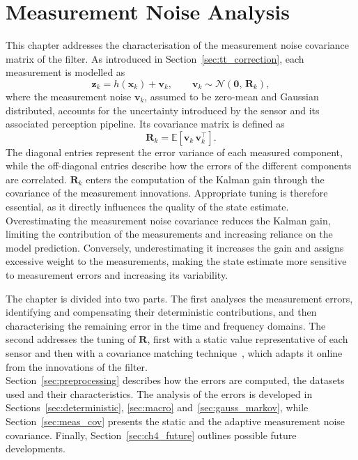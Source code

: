 \chapter{Measurement Noise Analysis}
\label{ch:adaptive_r}

This chapter addresses the characterisation of the measurement noise covariance matrix of
the filter. As introduced in Section~\ref{sec:tt_correction}, each
measurement is modelled as
\begin{equation}
    \mathbf{z}_k = h(\mathbf{x}_k) + \mathbf{v}_k,
    \qquad
    \mathbf{v}_k \sim \mathcal{N}\!\left(\mathbf{0},\, \mathbf{R}_k\right),
    \label{eq:ch4_meas}
\end{equation}
where the measurement noise $\mathbf{v}_k$, assumed to be zero-mean and Gaussian distributed, accounts for the
uncertainty introduced by the sensor and its associated perception pipeline. Its covariance
matrix is defined as
\begin{equation}
    \mathbf{R}_k = \mathbb{E}\left[\mathbf{v}_k\,\mathbf{v}_k^\top\right].
    \label{eq:ch4_Rk}
\end{equation}
The diagonal entries represent the error variance of each measured component, while the
off-diagonal entries describe how the errors of the different components are correlated.
$\mathbf{R}_k$ enters the computation of the Kalman gain through the covariance of the
measurement innovations. Appropriate tuning is therefore essential, as it directly influences
the quality of the state estimate. Overestimating the measurement noise covariance reduces
the Kalman gain, limiting the contribution of the measurements and increasing reliance on
the model prediction. Conversely, underestimating it increases the gain and assigns
excessive weight to the measurements, making the state estimate more sensitive to
measurement errors and increasing its variability.

The chapter is divided into two parts. The first analyses the measurement errors,
identifying and compensating their deterministic contributions, and then
characterising the remaining error in the time and frequency domains. The second addresses
the tuning of $\mathbf{R}$, first with a static value representative of each sensor and
then with a covariance matching technique~\cite{mehra1972}, which adapts it online from the innovations of the filter. \\Section~\ref{sec:preprocessing} describes how the errors are computed, the datasets used and their characteristics. The analysis of the errors is
developed in Sections~\ref{sec:deterministic}, \ref{sec:macro} and~\ref{sec:gauss_markov},
while Section~\ref{sec:meas_cov} presents the static and the adaptive measurement noise
covariance. Finally, Section~\ref{sec:ch4_future} outlines possible future developments.

